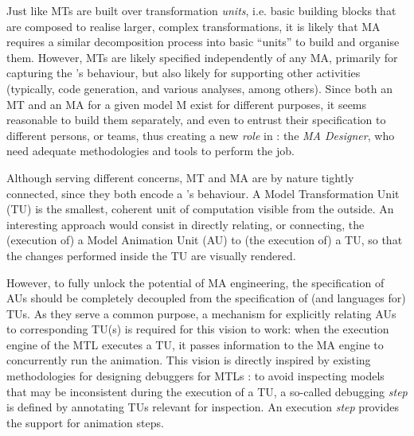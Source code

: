Just like MTs are built over transformation \emph{units}, i.e. basic building blocks
that are composed to realise larger, complex transformations, it is likely that 
MA requires a similar decomposition process into basic ``units'' to build and 
organise them. However, MTs are likely specified independently of any MA, primarily
for capturing the \DSL's behaviour, but also likely for supporting other activities
(typically, code generation, and various analyses, among others). Since both an MT
and an MA for a given model \textsf{M} exist for different purposes, it seems 
reasonable to build them separately, and even to entrust their specification to
different persons, or teams, thus creating a new \emph{role} in \MDE: the 
\emph{MA Designer}, who need adequate methodologies and tools to perform the job.

Although serving different concerns, MT and MA are by nature tightly connected,
since they both encode a \DSL's behaviour. A Model Transformation Unit (TU) is the
smallest, coherent unit of computation visible from the outside. An interesting
approach would consist in directly relating, or connecting, the (execution of) a
Model Animation Unit (AU) to (the execution of) a TU, so that the changes performed
inside the TU are visually rendered. 

However, to fully unlock the potential of MA engineering, the specification of AUs
should be completely decoupled from the specification of (and languages for) TUs.
As they serve a common purpose, a mechanism for explicitly relating AUs to corresponding
TU(s) is required for this vision to work: when the execution engine of the MTL
executes a TU, it passes information to the MA engine to concurrently run the
animation. This vision is directly inspired by existing methodologies for designing 
debuggers for MTLs \citep{bousse2018omniscient,J:VanMierlo-Vangheluwe-etAl:2020}:
to avoid inspecting models that may be inconsistent during the execution of a TU,
a so-called debugging \emph{step} is defined by annotating TUs relevant for inspection.
An execution \emph{step} provides the support for animation steps.


